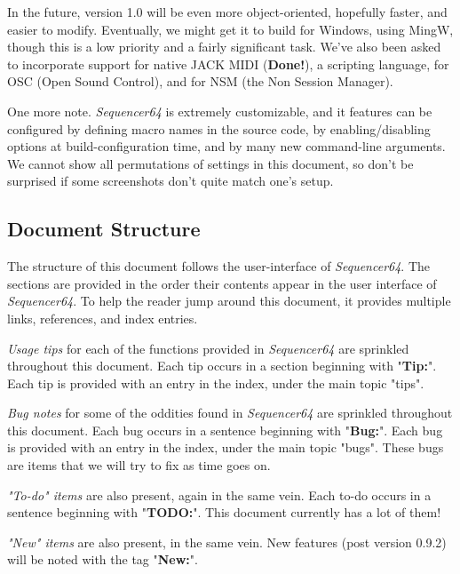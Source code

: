\documentclass[
 11pt,
 twoside,
 a4paper,
 headinclude,
 footinclude,
 final                                 %
]{article}
\begin{document}
   In the future, version 1.0 will be even more object-oriented, hopefully
   faster, and easier to modify.  Eventually, we might get it to build
   for Windows, using MingW, though this is a low priority and a fairly
   significant task.  We've also been asked to incorporate support for native
   JACK MIDI (\textbf{Done!}), a scripting language, for OSC (Open Sound
   Control), and for NSM (the Non Session Manager).

   One more note.  \textsl{Sequencer64} is extremely customizable, and
   it features can be configured by defining macro names in the source code,
   by enabling/disabling options at build-configuration time, and by many new
   command-line arguments.  We cannot show all permutations of settings in this
   document, so don't be surprised if some screenshots don't quite match
   one's setup.

\subsection{Document Structure}
\label{subsec:introduction_document_structure}

   The structure of this document follows the user-interface of
   \textsl{Sequencer64}.  The sections are provided in the order
   their contents appear in the user interface of \textsl{Sequencer64}.  To
   help the reader jump around this document, it provides
   multiple links, references, and index entries.

   \textsl{Usage tips}
   for each of the functions provided in
   \textsl{Sequencer64} are sprinkled throughout this document.
   Each tip occurs in a section beginning with "\textbf{Tip:}".
   Each tip is provided with an entry in the index, under the
   main topic "tips".

   \textsl{Bug notes}
   for some of the oddities found in \textsl{Sequencer64} are
   sprinkled throughout this document.
   Each bug occurs in a sentence beginning with "\textbf{Bug:}".
   Each bug is provided with an entry in the index, under the
   main topic "bugs".  These bugs are items that we will try to
   fix as time goes on.

   \textsl{"To-do" items}
   are also present, again in the same vein.
   Each to-do occurs in a sentence beginning with "\textbf{TODO:}".
   This document currently has a lot of them!

   \textsl{"New" items}
   are also present, in the same vein.
   New features (post version 0.9.2) will be noted with the tag
   "\textbf{New:}".
\end{document}
